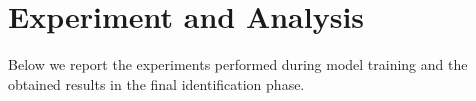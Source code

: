 \section{Experiment and Analysis}\label{sec:results}
Below we report the experiments performed during model training and the obtained results in the final identification phase.





